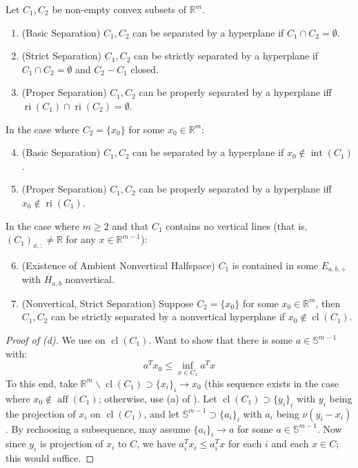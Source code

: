 \begin{prop}\label{prop:015-hyperplane-sep}
	Let $C_1,C_2$ be non-empty convex subsets of $\mathbb{R}^m$.
	\begin{enumerate}[label=(\alph*)]
		\item (Basic Separation) $C_1,C_2$ can be separated by a hyperplane if $C_1\cap C_2=\emptyset$.
		\item (Strict Separation) $C_1,C_2$ can be strictly separated by a hyperplane if $C_1\cap C_2=\emptyset$ and $C_2-C_1$ closed.
		\item (Proper Separation) $C_1,C_2$ can be properly separated by a hyperplane iff $\operatorname{ri}(C_1)\cap \operatorname{ri}(C_2)=\emptyset$.
	\end{enumerate}
	In the case where $C_2=\{x_0\}$ for some $x_0\in \mathbb{R}^m$:
	\begin{enumerate}[label=(\alph*)]
		\setcounter{enumi}{3}
		\item (Basic Separation) $C_1,C_2$ can be separated by a hyperplane if $x_0\notin \operatorname{int}(C_1)$.
		\item (Proper Separation) $C_1,C_2$ can be properly separated by a hyperplane iff $x_0\notin \operatorname{ri}(C_1)$.
	\end{enumerate}
	In the case where $m\geq 2$ and that $C_1$ contains no vertical lines (that is, $(C_{1})_{x,:}\neq \mathbb{R}$ for any $x\in \mathbb{R}^{m-1}$):
	\begin{enumerate}[label=(\alph*)]
		\setcounter{enumi}{5}
		\item (Existence of Ambient Nonvertical Halfspace) $C_1$ is contained in some $E_{a,b,+}$ with $H_{a,b}$ nonvertical.
		\item (Nonvertical, Strict Separation) Suppose $C_2=\{x_0\}$ for some $x_0\in \mathbb{R}^m$, then $C_1,C_2$ can be strictly separated by a nonvertical hyperplane if $x_0\notin \operatorname{cl}(C_1)$.
	\end{enumerate}
\end{prop}

\begin{proof}[Proof of (d)]
	We use  on $\operatorname{cl}(C_1)$. Want to show that there is some $a\in \mathbb{S}^{m-1}$ with:
	\[
		a^Tx_0\leq \underset{x\in C_1}{\operatorname{inf}}a^Tx
	\]
	To this end, take $\mathbb{R}^m\smallsetminus \operatorname{cl}(C_1)\supset \{x_i\}_i\to x_0$ (this sequence exists in the case where $x_0\notin \operatorname{aff}(C_1)$; otherwise, use (a) of ). Let $\operatorname{cl}(C_1)\supset\{y_i\}_i$ with $y_i$ being the projection of $x_i$ on $\operatorname{cl}(C_1)$, and let $\mathbb{S}^{m-1}\supset \{a_i\}_i$ with $a_i$ being $\nu(y_i-x_i)$. By rechoosing a subsequence, may assume $\{a_i\}_i\to a$ for some $a\in \mathbb{S}^{m-1}$. Now since $y_i$ is projection of $x_i$ to $C$, we have $a_i^Tx_i\leq a_i^Tx$ for each $i$ and each $x\in C$; this would suffice.
\end{proof}

